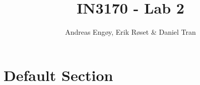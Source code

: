 \documentclass[twocolumn]{article}
\title{IN3170 - Lab 2}
\author{Andreas Engøy, Erik Røset \& Daniel Tran}
\date{\monthname[\the\month] \the\year}
\begin{document}
\maketitle

\section*{Default Section}
\end{document}
